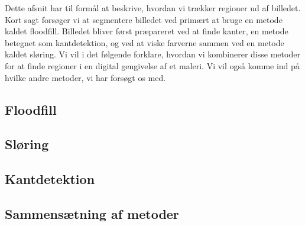 {
{\sffamily Dette afsnit har til formål at beskrive, hvordan vi trækker
regioner ud af billedet. Kort sagt forsøger vi at segmentere billedet
ved primært at bruge en metode kaldet floodfill. Billedet bliver
først præpareret ved at finde kanter, en metode betegnet som
kantdetektion, og ved at viske farverne sammen ved en metode kaldet sløring. Vi
vil i det følgende forklare, hvordan vi kombinerer disse metoder for at
finde regioner i en digital gengivelse af et maleri. Vi vil også komme
ind på hvilke andre metoder, vi har forsøgt os med.
}

\subsection{Floodfill\label{subsec_floodfill}}                                  %


\subsection{Sløring\label{udtraek_sloering}}                                    %


\subsection{Kantdetektion\label{udtraek_kanter}}                              %


\subsection{Sammensætning af metoder\label{sammensaetning_af_metoder}}


}

